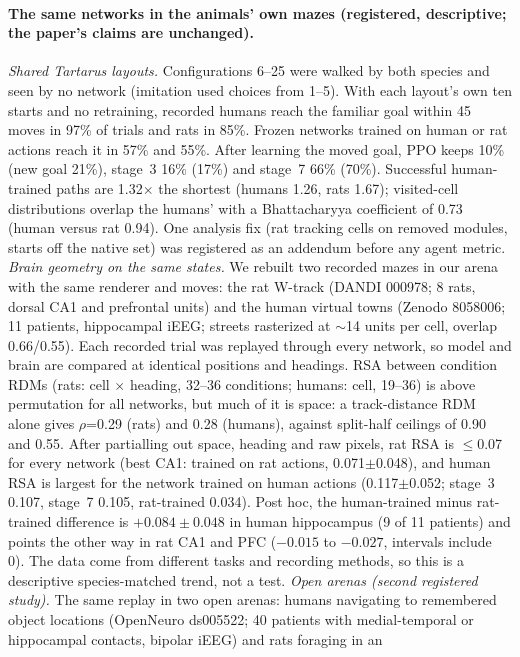 \documentclass[10pt,onecolumn,letterpaper]{article}
\begin{document}
\paragraph{The same networks in the animals' own mazes (registered, descriptive; the paper's claims are unchanged).}
\emph{Shared Tartarus layouts.} Configurations 6--25 were walked by both species and seen by no network (imitation used
choices from 1--5). With each layout's own ten starts and no retraining, recorded humans reach the familiar goal within 45
moves in 97\% of trials and rats in 85\%. Frozen networks trained on human or rat actions reach it in 57\% and 55\%. After
learning the moved goal, PPO keeps 10\% (new goal 21\%), stage~3 16\% (17\%) and stage~7 66\% (70\%). Successful human-trained
paths are 1.32$\times$ the shortest (humans 1.26, rats 1.67); visited-cell distributions overlap the humans' with a
Bhattacharyya coefficient of 0.73 (human versus rat 0.94). One analysis fix (rat tracking cells on removed modules, starts
off the native set) was registered as an addendum before any agent metric.
\emph{Brain geometry on the same states.} We rebuilt two recorded mazes in our arena with the same renderer and moves: the
rat W-track (DANDI 000978; 8 rats, dorsal CA1 and prefrontal units) and the human virtual towns (Zenodo 8058006; 11 patients,
hippocampal iEEG; streets rasterized at $\sim$14 units per cell, overlap 0.66/0.55). Each recorded trial was replayed through
every network, so model and brain are compared at identical positions and headings. RSA between condition RDMs (rats: cell
$\times$ heading, 32--36 conditions; humans: cell, 19--36) is above permutation for all networks, but much of it is space: a
track-distance RDM alone gives $\rho$=0.29 (rats) and 0.28 (humans), against split-half ceilings of 0.90 and 0.55. After
partialling out space, heading and raw pixels, rat RSA is $\le$0.07 for every network (best CA1: trained on rat actions,
0.071$\pm$0.048), and human RSA is largest for the network trained on human actions (0.117$\pm$0.052; stage~3 0.107, stage~7
0.105, rat-trained 0.034). Post hoc, the human-trained minus rat-trained difference is $+0.084\pm0.048$ in human hippocampus
(9 of 11 patients) and points the other way in rat CA1 and PFC ($-0.015$ to $-0.027$, intervals include 0). The data come
from different tasks and recording methods, so this is a descriptive species-matched trend, not a test.
\emph{Open arenas (second registered study).} The same replay in two open arenas: humans navigating to remembered object
locations (OpenNeuro ds005522; 40 patients with medial-temporal or hippocampal contacts, bipolar iEEG) and rats foraging in an
\end{document}
